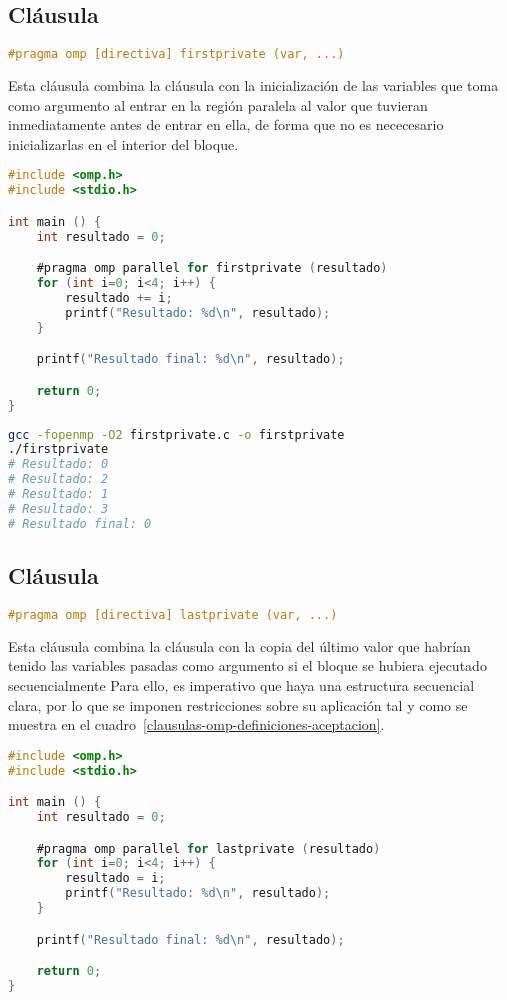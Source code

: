 \subsection{Cláusula }

\begin{lstlisting}[language=C]
#pragma omp [directiva] firstprivate (var, ...)
\end{lstlisting}

Esta cláusula combina la cláusula  con la inicialización de las variables que toma como argumento al entrar en la región paralela al valor que tuvieran inmediatamente antes de entrar en ella, de forma que no es nececesario inicializarlas en el interior del bloque.

\begin{lstlisting}[language=C]
#include <omp.h>
#include <stdio.h>

int main () {
	int resultado = 0;

	#pragma omp parallel for firstprivate (resultado)
	for (int i=0; i<4; i++) {
		resultado += i;
		printf("Resultado: %d\n", resultado);
	}

	printf("Resultado final: %d\n", resultado);

	return 0;
}
\end{lstlisting}

\begin{lstlisting}[language=sh]
gcc -fopenmp -O2 firstprivate.c -o firstprivate
./firstprivate
# Resultado: 0
# Resultado: 2
# Resultado: 1
# Resultado: 3
# Resultado final: 0
\end{lstlisting}

\subsection{Cláusula }

\begin{lstlisting}[language=C]
#pragma omp [directiva] lastprivate (var, ...)
\end{lstlisting}

Esta cláusula combina la cláusula  con la copia del último valor que habrían tenido las variables pasadas como argumento si el bloque se hubiera ejecutado secuencialmente
Para ello, es imperativo que haya una estructura secuencial clara, por lo que se imponen restricciones sobre su aplicación tal y como se muestra en el cuadro~\ref{clausulas-omp-definiciones-aceptacion}.

\begin{lstlisting}[language=C]
#include <omp.h>
#include <stdio.h>

int main () {
	int resultado = 0;

	#pragma omp parallel for lastprivate (resultado)
	for (int i=0; i<4; i++) {
		resultado = i;
		printf("Resultado: %d\n", resultado);
	}

	printf("Resultado final: %d\n", resultado);

	return 0;
}
\end{lstlisting}

